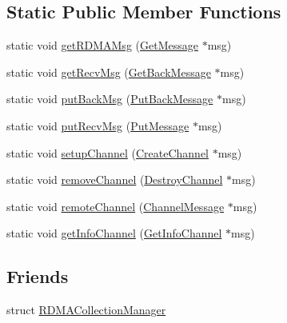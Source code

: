 \subsection*{Static Public Member Functions}
\begin{DoxyCompactItemize}
\item 
static void \hyperlink{structvt_1_1rdma_1_1_r_d_m_a_manager_aba5002562451e1264979003dcf1e659e}{get\+R\+D\+M\+A\+Msg} (\hyperlink{namespacevt_1_1rdma_acce0da4c9ea1233c3f132c1971943653}{Get\+Message} $\ast$msg)
\item 
static void \hyperlink{structvt_1_1rdma_1_1_r_d_m_a_manager_a1c11e7b5616c22d03fd3884f99d3e7ff}{get\+Recv\+Msg} (\hyperlink{namespacevt_1_1rdma_a72a94b92eba75ec9fec43b2a9a4ad878}{Get\+Back\+Message} $\ast$msg)
\item 
static void \hyperlink{structvt_1_1rdma_1_1_r_d_m_a_manager_ad8525c38d7d47c1e96a6ed4399e5b1ef}{put\+Back\+Msg} (\hyperlink{namespacevt_1_1rdma_a07a52401fe8185d190371b3333dc61ac}{Put\+Back\+Message} $\ast$msg)
\item 
static void \hyperlink{structvt_1_1rdma_1_1_r_d_m_a_manager_a87d44e05aeeb404290ac2a38b4631fe0}{put\+Recv\+Msg} (\hyperlink{namespacevt_1_1rdma_ae0a0330c647ec5ac5d508750f4cd4a06}{Put\+Message} $\ast$msg)
\item 
static void \hyperlink{structvt_1_1rdma_1_1_r_d_m_a_manager_a5189682bba9e4b73faa010bf78f96469}{setup\+Channel} (\hyperlink{structvt_1_1rdma_1_1_create_channel}{Create\+Channel} $\ast$msg)
\item 
static void \hyperlink{structvt_1_1rdma_1_1_r_d_m_a_manager_a240f9f8c6697b4fc94c8a8b1b4d6c737}{remove\+Channel} (\hyperlink{namespacevt_1_1rdma_a1273aeddd73c1ffac0d7383ef7a314d8}{Destroy\+Channel} $\ast$msg)
\item 
static void \hyperlink{structvt_1_1rdma_1_1_r_d_m_a_manager_a8c2cb5f8770dfe6265065c6040314399}{remote\+Channel} (\hyperlink{structvt_1_1rdma_1_1_channel_message}{Channel\+Message} $\ast$msg)
\item 
static void \hyperlink{structvt_1_1rdma_1_1_r_d_m_a_manager_a7e01a11f17c52dee2d564341866e2e29}{get\+Info\+Channel} (\hyperlink{structvt_1_1rdma_1_1_get_info_channel}{Get\+Info\+Channel} $\ast$msg)
\end{DoxyCompactItemize}
\subsection*{Friends}
\begin{DoxyCompactItemize}
\item 
struct \hyperlink{structvt_1_1rdma_1_1_r_d_m_a_manager_a59e73ef8c81ddf4094802bfda5ac42cc}{R\+D\+M\+A\+Collection\+Manager}
\end{DoxyCompactItemize}


